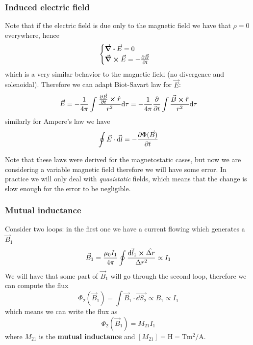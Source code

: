 \documentclass[12pt]{extarticle}
\begin{document}
\subsubsection{Induced electric field}

Note that if the electric field is due only to the magnetic field we have that $\rho = 0$ everywhere,
hence
\begin{equation}
	\begin{cases}
		\div \vec E = 0 \\
		\curl \vec E = -\pdv{\vec B}{t}
	\end{cases}
\end{equation}
which is a very similar behavior to the magnetic field (no divergence and solenoidal).
Therefore we can adapt Biot-Savart law for $\vec E$:
\begin{equation}
	\vec E = -\frac{1}{4 \pi} \int \frac{\pdv{\vec B}{t} \cross \hat r}{r^2} \dd \tau
	= -\frac{1}{4 \pi} \pdv{t} \int \frac{\vec B \cross \hat r}{r^2} \dd \tau
\end{equation}
similarly for Ampere's law we have
\begin{equation}
	\oint \vec E \cdot \vec{\dd l} = - \pdv{\Phi(\vec B)}{t}
\end{equation}

Note that these laws were derived for the magnetostatic cases, but now we are considering a variable magnetic field
therefore we will have some error.
In practice we will only deal with \emph{quasistatic} fields,
which means that the change is slow enough for the error to be negligible.

\subsubsection{Mutual inductance}

Consider two loops: in the first one we have a current flowing which generates a $\vec B_1$
\begin{equation}
	\vec B_1 = \frac{\mu_0 I_1}{4 \pi} \oint \frac{\vec{\dd l_1} \cross \hat{\Delta r}}{\Delta r^2} \propto I_1
\end{equation}
We will have that some part of $\vec B_1$ will go through the second loop, therefore we can compute the flux
\begin{equation}
	\Phi_2(\vec B_1) = \int \vec B_1 \cdot \vec{\dd S_2} \propto B_1 \propto I_1
\end{equation}
which means we can write the flux as
\begin{equation}
	\Phi_2(\vec B_1) = M_{21} I_1
\end{equation}
where $M_{21}$ is the \textbf{mutual inductance} and $[M_{21}] = \si{\henry} = \si{\tesla \meter \squared \per \ampere}$.
\end{document}
